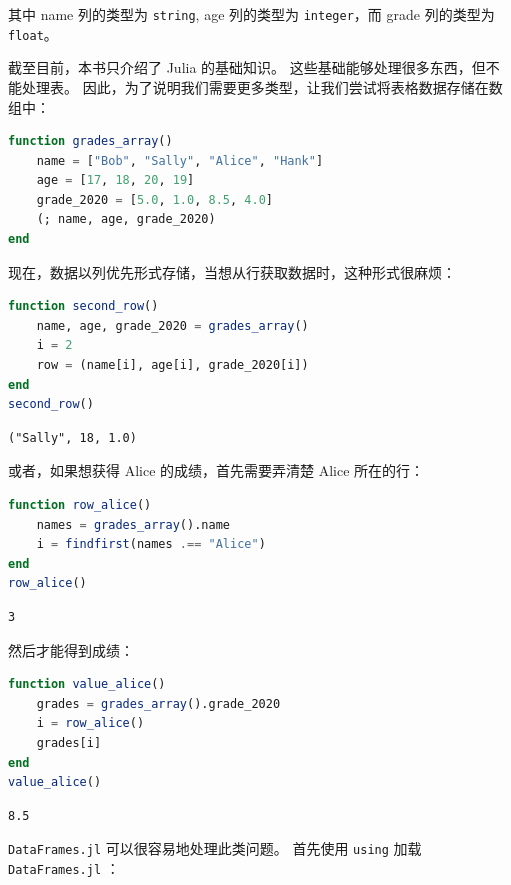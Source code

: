 \documentclass[
  notoc %
]{tufte-book}
\newcommand{\passthrough}[1]{#1}
\begin{document}
其中 name 列的类型为 \passthrough{\lstinline!string!}, age 列的类型为
\passthrough{\lstinline!integer!}，而 grade 列的类型为
\passthrough{\lstinline!float!}。

截至目前，本书只介绍了 Julia 的基础知识。
这些基础能够处理很多东西，但不能处理表。
因此，为了说明我们需要更多类型，让我们尝试将表格数据存储在数组中：

\begin{lstlisting}[language=Julia]
function grades_array()
    name = ["Bob", "Sally", "Alice", "Hank"]
    age = [17, 18, 20, 19]
    grade_2020 = [5.0, 1.0, 8.5, 4.0]
    (; name, age, grade_2020)
end
\end{lstlisting}

现在，数据以列优先形式存储，当想从行获取数据时，这种形式很麻烦：

\begin{lstlisting}[language=Julia]
function second_row()
    name, age, grade_2020 = grades_array()
    i = 2
    row = (name[i], age[i], grade_2020[i])
end
second_row()
\end{lstlisting}

\begin{lstlisting}[language=Output]
("Sally", 18, 1.0)
\end{lstlisting}

或者，如果想获得 Alice 的成绩，首先需要弄清楚 Alice 所在的行：

\begin{lstlisting}[language=Julia]
function row_alice()
    names = grades_array().name
    i = findfirst(names .== "Alice")
end
row_alice()
\end{lstlisting}

\begin{lstlisting}[language=Output]
3
\end{lstlisting}

然后才能得到成绩：

\begin{lstlisting}[language=Julia]
function value_alice()
    grades = grades_array().grade_2020
    i = row_alice()
    grades[i]
end
value_alice()
\end{lstlisting}

\begin{lstlisting}[language=Output]
8.5
\end{lstlisting}

\passthrough{\lstinline!DataFrames.jl!} 可以很容易地处理此类问题。
首先使用 \passthrough{\lstinline!using!} 加载
\passthrough{\lstinline!DataFrames.jl!} ：
\end{document}
